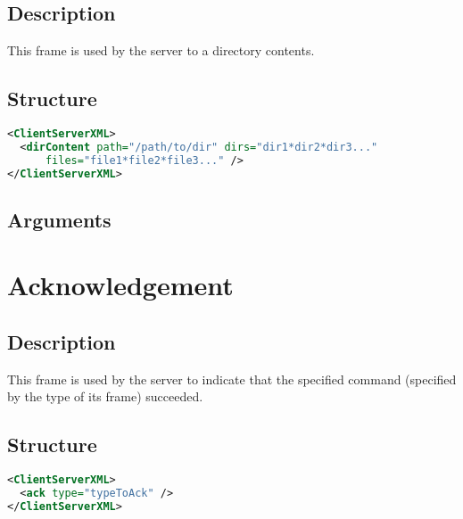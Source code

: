 \subsection{Description}

This frame is used by the server to a directory contents.

\subsection{Structure}

\begin{lstlisting}[language=XML]
<ClientServerXML>
  <dirContent path="/path/to/dir" dirs="dir1*dir2*dir3..." 
      files="file1*file2*file3..." />
</ClientServerXML>
\end{lstlisting}

\subsection{Arguments}


\section{Acknowledgement}
\label{ack}

\subsection{Description}

This frame is used by the server to indicate that the specified command
(specified by the type of its frame) succeeded.

\subsection{Structure}

\begin{lstlisting}[language=XML]
<ClientServerXML>
  <ack type="typeToAck" />
</ClientServerXML>
\end{lstlisting}

